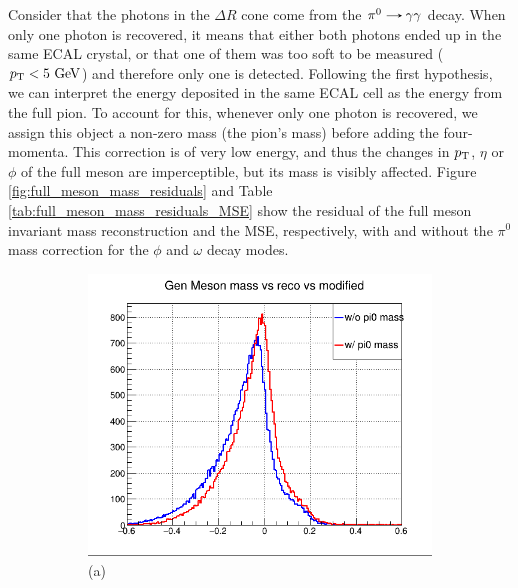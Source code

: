 \begin{myitemlist}
    Consider that the photons in the $\Delta R$ cone come from the $\pi^{0}\decaysto\gamma\gamma$ decay. When only one photon is recovered, it means that either both photons ended up in the same ECAL crystal, or that one of them was too soft to be measured ($p_\text{T} < 5\ \text{GeV}$) and therefore only one is detected. Following the first hypothesis, we can interpret the energy deposited in the same ECAL cell as the energy from the full pion. To account for this, whenever only one photon is recovered, we assign this object a non-zero mass (the pion's mass) before adding the four-momenta. This correction is of very low energy, and thus the changes in $p_\text{T}$, $\eta$ or $\phi$ of the full meson are imperceptible, but its mass is visibly affected. Figure \ref{fig:full_meson_mass_residuals} and Table \ref{tab:full_meson_mass_residuals_MSE} show the residual of the full meson invariant mass reconstruction and the MSE, respectively, with and without the $\pi^0$ mass correction for the $\phi$ and $\omega$ decay modes.
    \begin{figure}[!ht]
        \captionsetup[subfigure]{labelformat=empty}
        \vspace*{-0.2cm}
        \centering
        \setlength{\mylength}{\textwidth}
        \begin{subfigure}[t]{0.50\mylength}
                \centering
                \includegraphics[width=0.45\mylength]{resources/plots/fullmeson_mass_residual_phi.png}
                \caption{\footnotesize (a)}
        \end{subfigure}%
        \begin{subfigure}[t]{0.50\mylength}

\end{subfigure}
\end{figure}
\end{myitemlist}
